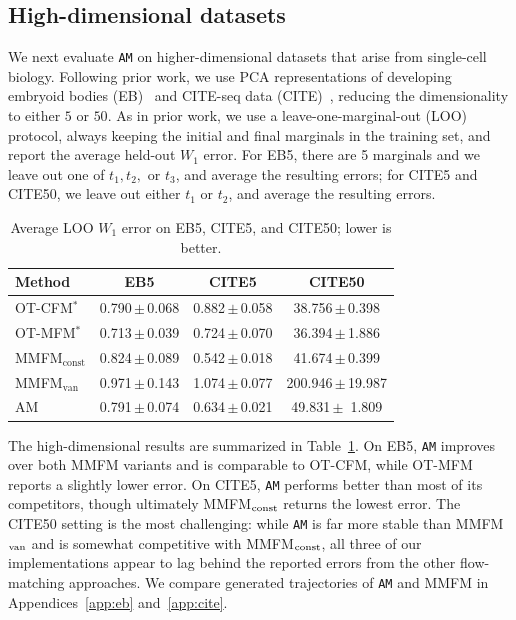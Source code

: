 \documentclass[12pt]{article}
\theoremstyle{plain}
\theoremstyle{plain}
\theoremstyle{remark}
\newcommand{\1}{\bm{1}}
\providecommand{\wentry}[2]{#1\,{\color{stdgray}$\pm$\,#2}}
\theoremstyle{plain}
\theoremstyle{definition}
\theoremstyle{remark}
\begin{document}
\subsection{High-dimensional datasets}
We next evaluate \texttt{AM} on higher-dimensional datasets that arise from single-cell biology. Following prior work, we use PCA representations of developing embryoid bodies (EB)~\citep{moon2019eb} and CITE-seq data (CITE)~\citep{burkhardtcite}, reducing the dimensionality to either $5$ or $50$. As in prior work, we use a leave-one-marginal-out (LOO) protocol, always keeping the initial and final marginals in the training set, and report the average held-out $W_1$ error. For EB5, there are 5 marginals and we leave out one of $t_1, t_2,$ or $t_3$, and average the resulting errors; for CITE5 and CITE50, we leave out either $t_1$ or $t_2$, and average the resulting errors.

\begin{table}[t]
\centering
\caption{Average LOO $W_1$ error on EB5, CITE5, and CITE50; lower is better.}
\label{tab:summary-high-dim}
\begin{tabular}{@{}lccc@{}}
\textbf{Method} & \textbf{EB5} & \textbf{CITE5} & \textbf{CITE50} \\
\midrule
OT-CFM$^{*}$ & \wentry{0.790}{0.068} & \wentry{0.882}{0.058} & \wentry{38.756}{0.398} \\
OT-MFM$^{*}$ & \wentry{0.713}{0.039} & \wentry{0.724}{0.070} & \wentry{36.394}{1.886} \\
\midrule
MMFM$_{\mathrm{const}}$ & \wentry{0.824}{0.089} & \wentry{0.542}{0.018} & \wentry{41.674}{0.399} \\
MMFM$_{\mathrm{van}}$ & \wentry{0.971}{0.143} & \wentry{1.074}{0.077} & \wentry{200.946}{19.987} \\
{AM} & \wentry{0.791}{0.074} & \wentry{0.634}{0.021} & \wentry{49.831}{ 1.809} \\
\end{tabular}
\end{table}





The high-dimensional results are summarized in Table~\ref{tab:summary-high-dim}. On EB5, \texttt{AM} improves over both MMFM variants and is comparable to OT-CFM, while OT-MFM reports a slightly lower error. On CITE5, \texttt{AM} performs better than most of its competitors, though ultimately MMFM$_{\rm const}$ returns the lowest error. The CITE50 setting is the most challenging: while \texttt{AM} is far more stable than MMFM$_{\rm van}$ and is somewhat competitive with MMFM$_{\rm const}$, all three of our implementations appear to lag behind the reported errors from the other flow-matching approaches. We compare generated trajectories of \texttt{AM} and MMFM in Appendices~\ref{app:eb} and~\ref{app:cite}.
\end{document}

